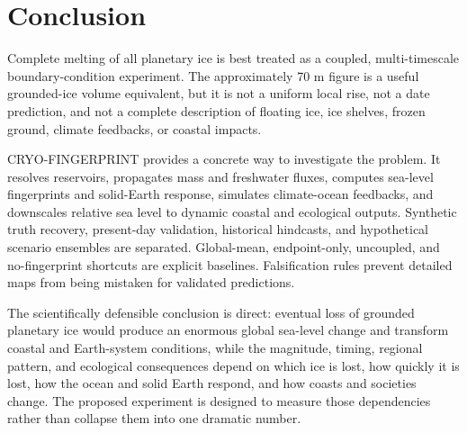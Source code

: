 \documentclass[conference]{IEEEtran}
\begin{document}
\section{Conclusion}

Complete melting of all planetary ice is best treated as a coupled, multi-timescale boundary-condition experiment. The approximately 70 m figure is a useful grounded-ice volume equivalent, but it is not a uniform local rise, not a date prediction, and not a complete description of floating ice, ice shelves, frozen ground, climate feedbacks, or coastal impacts.

CRYO-FINGERPRINT provides a concrete way to investigate the problem. It resolves reservoirs, propagates mass and freshwater fluxes, computes sea-level fingerprints and solid-Earth response, simulates climate-ocean feedbacks, and downscales relative sea level to dynamic coastal and ecological outputs. Synthetic truth recovery, present-day validation, historical hindcasts, and hypothetical scenario ensembles are separated. Global-mean, endpoint-only, uncoupled, and no-fingerprint shortcuts are explicit baselines. Falsification rules prevent detailed maps from being mistaken for validated predictions.

The scientifically defensible conclusion is direct: eventual loss of grounded planetary ice would produce an enormous global sea-level change and transform coastal and Earth-system conditions, while the magnitude, timing, regional pattern, and ecological consequences depend on which ice is lost, how quickly it is lost, how the ocean and solid Earth respond, and how coasts and societies change. The proposed experiment is designed to measure those dependencies rather than collapse them into one dramatic number.
\end{document}
